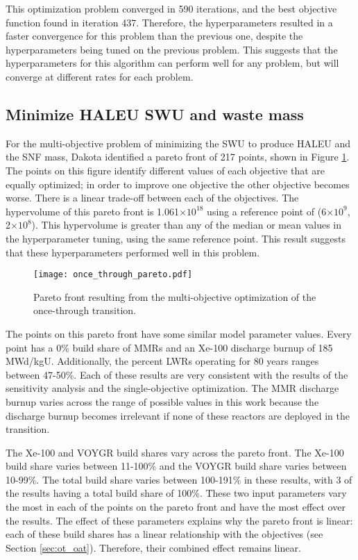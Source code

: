 This optimization problem converged in 590 iterations, and the best objective 
function found in iteration 437. Therefore, the hyperparameters resulted 
in a faster convergence for this problem than the previous one, despite the 
hyperparameters being tuned on the previous problem. This suggests that 
the hyperparameters for this algorithm can perform well for any problem, 
but will converge at different rates for each problem. 

\subsection{Minimize HALEU SWU and waste mass}
For the multi-objective problem of minimizing the \gls{SWU} to produce 
\gls{HALEU} and the \gls{SNF} mass, Dakota identified a pareto front 
of 217 points, shown in Figure \ref{fig:once_through_pareto}. The points 
on this figure identify different values of each objective that are equally 
optimized; in order to improve one objective the other objective becomes 
worse. There is a linear trade-off between each of the objectives. 
The hypervolume of this pareto front is 1.061$\times 10^18$ using a 
reference point of (6$\times 10^9$, 2$\times 10^8$). This hypervolume is 
greater than any of the median or mean values in the hyperparameter tuning,
using the same reference point. This result suggests that these hyperparameters 
performed well in this problem. 


\begin{figure}[ht]
    \centering 
    \texttt{[image: once\_through\_pareto.pdf]}
    \caption{Pareto front resulting from the multi-objective optimization 
    of the once-through transition.}
    \label{fig:once_through_pareto}
\end{figure}

The points on this pareto front have some similar model parameter values. 
Every point has a 0\% build share of \glspl{MMR} and an Xe-100 discharge 
burnup of 185 MWd/kgU. Additionally, the percent \glspl{LWR} operating 
for 80 years ranges between 47-50\%. Each of these results are very 
consistent with the results of the sensitivity analysis and the 
single-objective optimization. The \gls{MMR} discharge burnup varies 
across the range of possible values in this work because the discharge 
burnup becomes irrelevant if none of these reactors are deployed in the
transition.

The Xe-100 and VOYGR build shares vary across the pareto front. The Xe-100 
build share varies between 11-100\% and the VOYGR build share varies 
between 10-99\%. The total build share varies between 100-191\% in these 
results, with 3 of the results having a total build share of 100\%. 
These two input parameters vary the most in each of the points on 
the pareto front and have the most effect over the results. The effect of 
these parameters explains why the pareto front is linear: each of these 
build shares has a linear relationship with the objectives (see Section 
\ref{sec:ot_oat}). Therefore, their combined effect remains linear.

